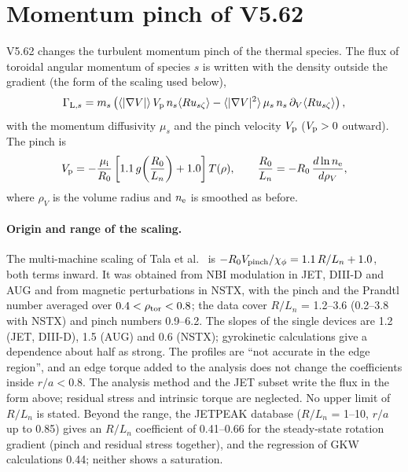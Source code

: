 \documentclass[11pt]{article}
\def\r#1{{\rm#1}}
\def\aves#1{\langle#1\rangle}
\begin{document}
\clearpage
\section{Momentum pinch of V5.62}
\setcounter{equation}{0}
\label{sec:v562}

V5.62 changes the turbulent momentum pinch of the thermal species.  The flux of
toroidal angular momentum of species $s$ is written with the density outside the
gradient (the form of the scaling used below),
\begin{equation}
  \Gamma_{\r{L},s} = m_s\left(\aves{|\nabla V|}\,V_\r{p}\,n_s\aves{Ru_{s\zeta}}
   - \aves{|\nabla V|^2}\,\mu_s\,n_s\,\partial_V\aves{Ru_{s\zeta}}\right),
\end{equation}
with the momentum diffusivity $\mu_s$ and the pinch velocity $V_\r{p}$ ($V_\r{p}>0$
outward).  The pinch is
\begin{equation}
  V_\r{p} = -\frac{\mu_\r{i}}{R_0}\left[1.1\,g\!\left(\frac{R_0}{L_n}\right) + 1.0\right] T(\rho),
  \qquad \frac{R_0}{L_n} = -R_0\,\frac{d\ln n_\r{e}}{d\rho_V},
  \label{eq:v562pinch}
\end{equation}
where $\rho_V$ is the volume radius and $n_\r{e}$ is smoothed as before.

\paragraph{Origin and range of the scaling.}  The multi-machine scaling of Tala
et al.\ \cite{Tala2012} is $-R_0V_\r{pinch}/\chi_\phi = 1.1\,R/L_n + 1.0$, both terms
inward.  It was obtained from NBI modulation in JET, DIII-D and AUG and from
magnetic perturbations in NSTX, with the pinch and the Prandtl number averaged over
$0.4<\rho_\r{tor}<0.8$; the data cover $R/L_n$ = 1.2--3.6 (0.2--3.8 with NSTX) and
pinch numbers 0.9--6.2.  The slopes of the single devices are 1.2 (JET, DIII-D), 1.5
(AUG) and 0.6 (NSTX); gyrokinetic calculations give a dependence about half as strong.
The profiles are ``not accurate in the edge region'', and an edge torque added to the
analysis does not change the coefficients inside $r/a<0.8$.  The analysis method
\cite{Mantica2010} and the JET subset \cite{Tala2011} write the flux in the form
above; residual stress and intrinsic torque are neglected.  No upper limit of $R/L_n$
is stated.  Beyond the range, the JETPEAK database \cite{Weisen2012} ($R/L_n$ = 1--10,
$r/a$ up to 0.85) gives an $R/L_n$ coefficient of 0.41--0.66 for the steady-state
rotation gradient (pinch and residual stress together), and the regression of GKW
calculations 0.44; neither shows a saturation.
\end{document}
